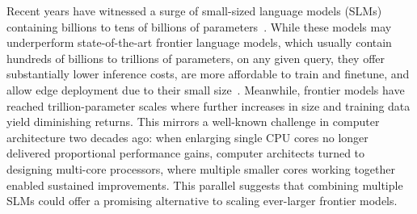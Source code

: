 


Recent years have witnessed a surge of small-sized language models (SLMs) containing billions to tens of billions of parameters~\citep{wang2024comprehensivesurveysmalllanguage, javaheripi2023phi, guo2025deepseek, allal2025smollm2}. While these models may underperform state-of-the-art frontier language models, which usually contain hundreds of billions to trillions of parameters, on any given query, they offer substantially lower inference costs, are more affordable to train and finetune, and allow edge deployment due to their small size~\citep{belcak2025small}.  
Meanwhile, frontier models have reached trillion-parameter scales where further increases in size and training data yield diminishing returns. This mirrors a well-known challenge in computer architecture two decades ago: when enlarging single CPU cores no longer delivered proportional performance gains, computer architects turned to designing multi-core processors, where multiple smaller cores working together enabled sustained improvements.  This parallel suggests that combining multiple SLMs could offer a promising alternative to scaling ever-larger frontier models.



